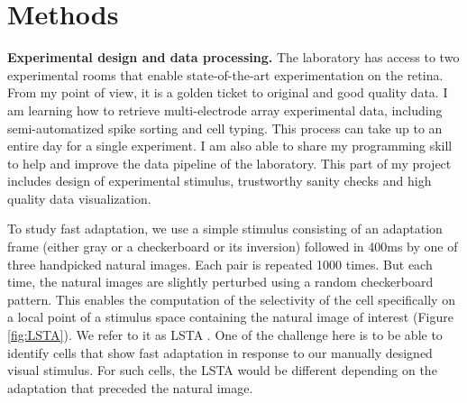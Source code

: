 \section{Methods}
\label{sec:methods}

\tab \textbf{Experimental design and data processing.} The laboratory has access to two experimental rooms that enable state-of-the-art experimentation on the retina. From my point of view, it is a golden ticket to original and good quality data. I am learning how to retrieve multi-electrode array experimental data, including semi-automatized spike sorting and cell typing. This process can take up to an entire day for a single experiment. I am also able to share my programming skill to help and improve the data pipeline of the laboratory. This part of my project includes design of experimental stimulus, trustworthy sanity checks and high quality data visualization. %

To study fast adaptation, we use a simple stimulus consisting of an adaptation frame (either gray or a checkerboard or its inversion) followed in 400ms by one of three handpicked natural images. Each pair is repeated 1000 times. But each time, the natural images are slightly perturbed using a random checkerboard pattern. This enables the computation of the selectivity of the cell specifically on a local point of a stimulus space containing the natural image of interest (Figure \ref{fig:LSTA}). We refer to it as LSTA \citep{goldin_context-dependent_2022}. One of the challenge here is to be able to identify cells that show fast adaptation in response to our manually designed visual stimulus. For such cells, the LSTA would be different depending on the adaptation that preceded the natural image. %


